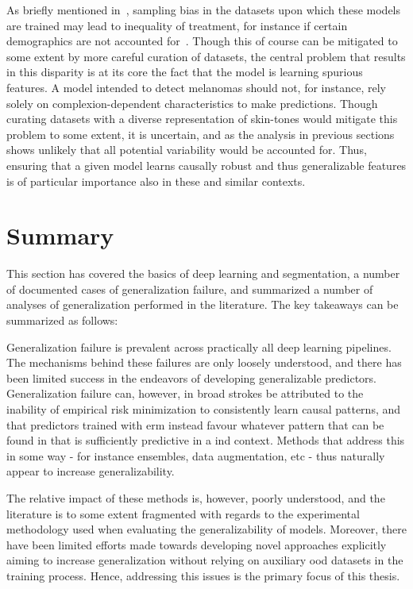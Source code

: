     As briefly mentioned in~, sampling bias in the datasets upon which these models are trained may lead to inequality of treatment, for instance if certain demographics are not accounted for~\cite{social_consequence_1}. Though this of course can be mitigated to some extent by more careful curation of datasets, the central problem that results in this disparity is at its core the fact that the model is learning spurious features. A model intended to detect melanomas should not, for instance, rely solely on complexion-dependent characteristics to make predictions. Though curating datasets with a diverse representation of skin-tones would mitigate this problem to some extent, it is uncertain, and as the analysis in previous sections shows unlikely that all potential variability would be accounted for. Thus, ensuring that a given model learns causally robust and thus generalizable features is of particular importance also in these and similar contexts. 
    
    
\section{Summary}
This section has covered the basics of deep learning and segmentation, a number of documented cases of generalization failure, and summarized a number of analyses of generalization performed in the literature. The key takeaways can be summarized as follows: 

Generalization failure is prevalent across practically all deep learning pipelines. The mechanisms behind these failures are only loosely understood, and there has been limited success in the endeavors of developing generalizable predictors. Generalization failure can, however, in broad strokes be attributed to the inability of empirical risk minimization to consistently learn causal patterns, and that predictors trained with \gls{erm} instead favour whatever pattern that can be found in that is sufficiently predictive in a \gls{ind} context. Methods that address this in some way - for instance ensembles, data augmentation, etc - thus naturally appear to increase generalizability. 

The relative impact of these methods is, however, poorly understood, and the literature is to some extent fragmented with regards to the experimental methodology used when evaluating the generalizability of models. Moreover, there have been limited efforts made towards developing novel approaches explicitly aiming to increase generalization without relying on auxiliary \gls{ood} datasets in the training process. Hence, addressing this issues is the primary focus of this thesis.


